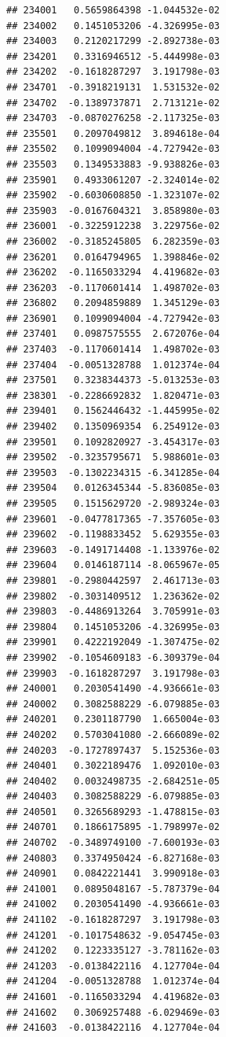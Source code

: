 \begin{frame}[fragile]
\begin{verbatim}
## 234001   0.5659864398 -1.044532e-02
## 234002   0.1451053206 -4.326995e-03
## 234003   0.2120217299 -2.892738e-03
## 234201   0.3316946512 -5.444998e-03
## 234202  -0.1618287297  3.191798e-03
## 234701  -0.3918219131  1.531532e-02
## 234702  -0.1389737871  2.713121e-02
## 234703  -0.0870276258 -2.117325e-03
## 235501   0.2097049812  3.894618e-04
## 235502   0.1099094004 -4.727942e-03
## 235503   0.1349533883 -9.938826e-03
## 235901   0.4933061207 -2.324014e-02
## 235902  -0.6030608850 -1.323107e-02
## 235903  -0.0167604321  3.858980e-03
## 236001  -0.3225912238  3.229756e-02
## 236002  -0.3185245805  6.282359e-03
## 236201   0.0164794965  1.398846e-02
## 236202  -0.1165033294  4.419682e-03
## 236203  -0.1170601414  1.498702e-03
## 236802   0.2094859889  1.345129e-03
## 236901   0.1099094004 -4.727942e-03
## 237401   0.0987575555  2.672076e-04
## 237403  -0.1170601414  1.498702e-03
## 237404  -0.0051328788  1.012374e-04
## 237501   0.3238344373 -5.013253e-03
## 238301  -0.2286692832  1.820471e-03
## 239401   0.1562446432 -1.445995e-02
## 239402   0.1350969354  6.254912e-03
## 239501   0.1092820927 -3.454317e-03
## 239502  -0.3235795671  5.988601e-03
## 239503  -0.1302234315 -6.341285e-04
## 239504   0.0126345344 -5.836085e-03
## 239505   0.1515629720 -2.989324e-03
## 239601  -0.0477817365 -7.357605e-03
## 239602  -0.1198833452  5.629355e-03
## 239603  -0.1491714408 -1.133976e-02
## 239604   0.0146187114 -8.065967e-05
## 239801  -0.2980442597  2.461713e-03
## 239802  -0.3031409512  1.236362e-02
## 239803  -0.4486913264  3.705991e-03
## 239804   0.1451053206 -4.326995e-03
## 239901   0.4222192049 -1.307475e-02
## 239902  -0.1054609183 -6.309379e-04
## 239903  -0.1618287297  3.191798e-03
## 240001   0.2030541490 -4.936661e-03
## 240002   0.3082588229 -6.079885e-03
## 240201   0.2301187790  1.665004e-03
## 240202   0.5703041080 -2.666089e-02
## 240203  -0.1727897437  5.152536e-03
## 240401   0.3022189476  1.092010e-03
## 240402   0.0032498735 -2.684251e-05
## 240403   0.3082588229 -6.079885e-03
## 240501   0.3265689293 -1.478815e-03
## 240701   0.1866175895 -1.798997e-02
## 240702  -0.3489749100 -7.600193e-03
## 240803   0.3374950424 -6.827168e-03
## 240901   0.0842221441  3.990918e-03
## 241001   0.0895048167 -5.787379e-04
## 241002   0.2030541490 -4.936661e-03
## 241102  -0.1618287297  3.191798e-03
## 241201  -0.1017548632 -9.054745e-03
## 241202   0.1223335127 -3.781162e-03
## 241203  -0.0138422116  4.127704e-04
## 241204  -0.0051328788  1.012374e-04
## 241601  -0.1165033294  4.419682e-03
## 241602   0.3069257488 -6.029469e-03
## 241603  -0.0138422116  4.127704e-04

\end{verbatim}
\end{frame}

